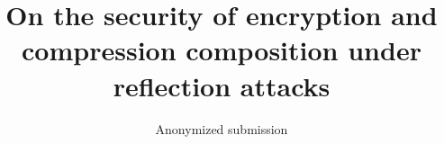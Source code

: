 \documentclass[letterpaper,twocolumn,10pt]{article}
\begin{document}
\title{On the security of encryption and compression composition under reflection attacks}

\author{
    Anonymized submission
}

\maketitle

\thispagestyle{empty}

















\end{document}
